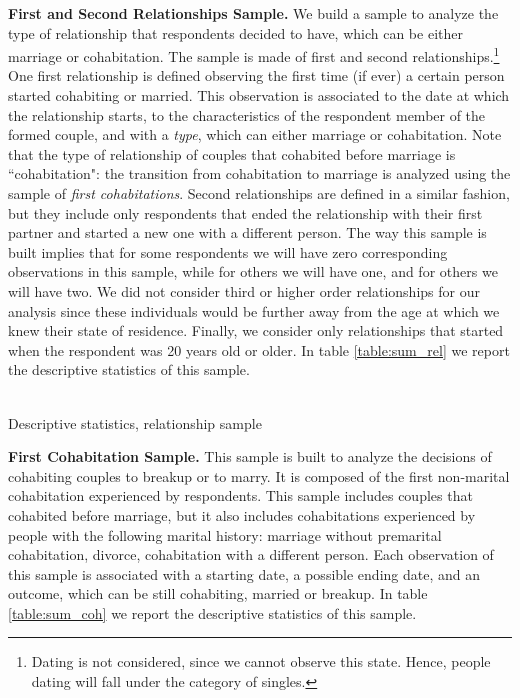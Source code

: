 \documentclass[12pt]{article}
\numberwithin{table}{section}
\begin{document}
\textbf{First and Second Relationships Sample.} We build a sample to analyze the type of relationship that respondents decided to have, which can be either marriage or cohabitation. The sample is made of first and second relationships.\footnote{Dating is not considered, since we cannot observe this state. Hence, people dating will fall under the category of singles.} One first relationship is defined observing the first time (if ever) a certain person started cohabiting or married. This observation is associated to the date at which the relationship starts, to the characteristics of the respondent member of the formed couple, and with a \textit{type}, which can either marriage or cohabitation. Note that the type of relationship of couples that cohabited before marriage is ``cohabitation": the transition from cohabitation to marriage is analyzed using the sample of \textit{first cohabitations}. Second relationships are defined in a similar fashion, but they include only respondents that ended the relationship with their first partner and started a new one with a different person. The way this sample is built implies that for some respondents we will have zero corresponding observations in this sample, while for others we will have one, and for others we will have two. We did not consider third or higher order relationships for our analysis since these individuals would be further away from the age at which we knew their state of residence. Finally, we consider only relationships that started when the respondent was 20 years old or older. In table \ref{table:sum_rel} we report the descriptive statistics of this sample.

\begin{table}[!htbp]\centering
	\caption{\\Descriptive statistics, relationship sample}
	\label{table:sum_rel}

\end{table}
\FloatBarrier
\textbf{First Cohabitation Sample.} This sample is built to analyze the decisions of cohabiting couples to breakup or to marry. It is composed of the first non-marital cohabitation experienced by respondents. This sample includes couples that cohabited before marriage, but it also includes cohabitations experienced by people with the following marital history: marriage without premarital cohabitation, divorce, cohabitation with a different person. Each observation of this sample is associated with a starting date, a possible ending date, and an outcome, which can be still cohabiting, married or breakup. In table \ref{table:sum_coh} we report the descriptive statistics of this sample.
\end{document}
